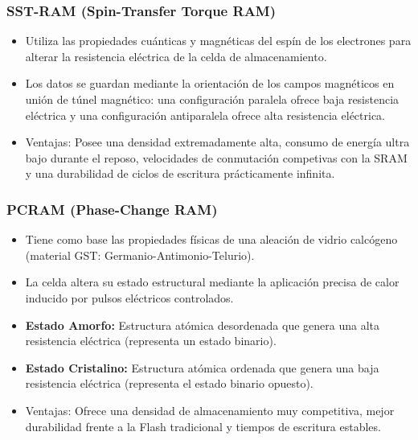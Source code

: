 \documentclass{article}
\begin{document}
\subsubsection{SST-RAM (Spin-Transfer Torque RAM)}
\label{sec:org1fd632c}
\begin{itemize}
\item Utiliza las propiedades cuánticas y magnéticas del espín de los
electrones para alterar la resistencia eléctrica de la celda de
almacenamiento.
\item Los datos se guardan mediante la orientación de los campos
magnéticos en unión de túnel magnético: una configuración paralela
ofrece baja resistencia eléctrica y una configuración antiparalela
ofrece alta resistencia eléctrica.
\item Ventajas: Posee una densidad extremadamente alta, consumo de energía
ultra bajo durante el reposo, velocidades de conmutación
competivas con la SRAM y una durabilidad de ciclos de escritura
prácticamente infinita.
\end{itemize}

\subsubsection{PCRAM (Phase-Change RAM)}
\label{sec:orgf82a58f}
\begin{itemize}
\item Tiene como base las propiedades físicas de una aleación de vidrio
calcógeno (material GST: Germanio-Antimonio-Telurio).
\item La celda altera su estado estructural mediante la aplicación precisa
de calor inducido por pulsos eléctricos controlados.
\item \textbf{Estado Amorfo:} Estructura atómica desordenada que genera una alta
resistencia eléctrica (representa un estado binario).
\item \textbf{Estado Cristalino:} Estructura atómica ordenada que genera una baja
resistencia eléctrica (representa el estado binario opuesto).
\item Ventajas: Ofrece una densidad de almacenamiento muy competitiva,
mejor durabilidad frente a la Flash tradicional y tiempos de
escritura estables.
\end{itemize}
\end{document}
